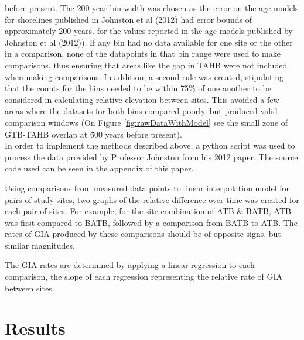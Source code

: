 \documentclass{article}
\begin{document}
 before present. The 200 year bin width was chosen as the error on the age models
 for shorelines published in Johnston et al (2012) had error bounds of approximately
 200 years.
 for the values reported in the age models published by Johnston et al (2012)). If any bin had no data
 available for one site or the other in a comparison, none of the datapoints in
 that bin range were used to make comparisons, thus ensuring that areas like the
 gap in TAHB were not included when making comparisons. In addition, a second rule
 was created, stipulating that the counts for the bins needed to be within 75\% of one another to be considered
 in calculating relative elevation between sites. This
 avoided a few areas where the datasets for both bins compared poorly,
 but produced valid comparison windows (On Figure \ref{fig:rawDataWithModel} see the small zone of GTB-TAHB overlap
 at \~ 600 years before present).\\
 In order to implement the methods described above, a python script was used to
 process the data provided by Professor Johnston from his 2012 paper. The source
 code used can be seen in the appendix of this paper.
 
 Using comparisons from measured data points to linear interpolation model for
 pairs of study sites,
 two graphs of the relative difference over time was created for each pair
 of sites. For example, for
 the site combination of ATB \& BATB, ATB was first compared to BATB, followed 
 by a comparison from BATB to ATB. The rates of GIA produced by these comparisons
 should be of opposite signs, but similar magnitudes.
 
 The GIA rates are determined by applying a linear regression to each comparison,
 the slope of each regression representing the relative rate of GIA between sites.

\newpage

\section{Results}



\end{document}
